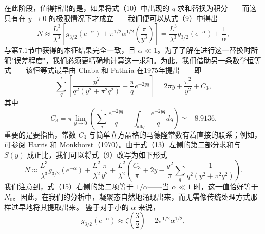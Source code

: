 在此阶段，值得指出的是，如果将式（10）中出现的 \(q\) 求和替换为积分——而这只有在 \(y \to 0\) 的极限情况下才成立——我们便可以从式（9）中得出
\begin{equation}\tag{17.6.14}\label{eq:17.6.14}
N \approx \frac { L ^{3} } { \lambda ^{3} } \left[ g _ { 3 / 2 } \left( e ^{- \alpha} \right) + \pi ^{1 / 2} \alpha ^{1 / 2} \left( \frac { \pi } { y ^{3} } \right) \right] = \frac { L ^{3} } { \lambda ^{3} } g _ { 3 / 2 } \left( e ^{- \alpha} \right) + \frac { 1 } { \alpha } ,
\end{equation}
与第7.1节中获得的本征结果完全一致，且 \(\alpha \ll 1\)。为了了解在进行这一替换时所犯"误差程度"，我们必须更精确地计算这一求和。为此，我们借助另一条数学恒等式——该恒等式最早由 Chaba 和 Pathria 在1975年提出——即
\begin{equation}\tag{17.6.15}\label{eq:17.6.15}
\sum _ { q } ^{\prime} \left[ \frac { y ^{2} } { q ^{2} \left( y ^{2} + \pi ^{2} q ^{2} \right) } + \frac { \pi } { q } e ^{- 2 y q} \right] = 2 \pi y + \frac { \pi ^{2} } { y ^{2} } + C _ { 3 } ,
\end{equation}
其中
\begin{equation}\tag{17.6.16}\label{eq:17.6.16}
C _ { 3 } = \pi \operatorname* { l i m } _ { y \to 0 } \left( \sum _ { q } ^{\prime} \frac { e ^{- 2 y q} } { q } - \int _ { \mathrm { a l l } q } \frac { e ^{- 2 y q} } { q } d q \right) \simeq - 8 . 91 36 .
\end{equation}
重要的是要指出，常数 \(C_{3}\) 与简单立方晶格的马德隆常数有着直接的联系；例如，可参阅 Harris 和 Monkhorst（1970）。由于式（13）左侧的第二部分求和与 \(S(y)\) 成正比，我们可以将式（9）改写为如下形式
\begin{equation}\tag{17.6.17}\label{eq:17.6.17}
N \approx \frac { L ^{3} } { \lambda ^{3} } g _ { 3 / 2 } \left( e ^{- \alpha} \right) + \frac { L ^{2} } { \lambda ^{2} } \frac { \pi } { y ^{2} } + \frac { L ^{2} } { \lambda ^{2} } \left( \frac { C _ { 3 } } { \pi } + 2 y - \frac { y ^{2} } { \pi } \sum _ { q } ^{\prime} \frac { 1 } { q ^{2} \left( y ^{2} + \pi ^{2} q ^{2} \right) } \right) .
\end{equation}
我们注意到，式（15）右侧的第二项等于 \(1/\alpha\)——当 \(\alpha \ll 1\) 时，这一值恰好等于 \(N_0\)。因此，在我们的分析中，凝聚态自然地涌现出来，而无需像传统处理方式那样过早地将其提取出来。
鉴于对于小的 \(\alpha\) 来说，
\begin{equation}\tag{17.6.18}\label{eq:17.6.18}
g _ { 3 / 2 } \left( e ^{- \alpha} \right) \approx \zeta \left( \frac { 3 } { 2 } \right) - 2 \pi ^{1 / 2} \alpha ^{1 / 2} ,
\end{equation}
